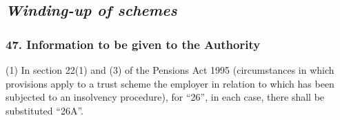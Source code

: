 \documentclass[12pt,a4paper]{article}
\begin{document}

\subsection{\itshape Winding-up of schemes}

\subsubsection{47. Information to be given to the Authority}

(1) In section 22(1)  and (3)  of the Pensions Act 1995 (circumstances in which provisions apply to a trust scheme the employer in relation to which has been subjected to an insolvency procedure), for “26”, in each case, there shall be substituted “26A”.
\end{document}
